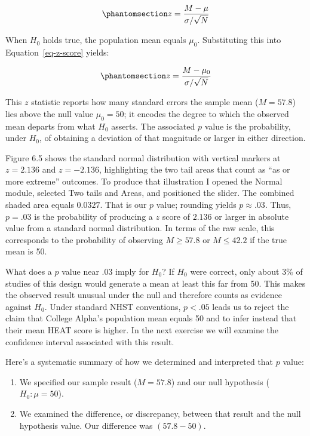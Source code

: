 \documentclass[
  letterpaper,
  DIV=11,
  numbers=noendperiod]{scrreprt}
\begin{document}
\begin{equation}\phantomsection\label{eq-z-score}{
z = \frac{M - \mu}{\sigma/\sqrt{N}}
}\end{equation}

When \(H_0\) holds true, the population mean equals \(\mu_0\).
Substituting this into Equation~\ref{eq-z-score} yields:

\begin{equation}\phantomsection\label{eq-z-null}{
z = \frac{M - \mu_0}{\sigma/\sqrt{N}}
}\end{equation}

This \(z\) statistic reports how many standard errors the sample mean
(\(M=57.8\)) lies above the null value \(\mu_0 = 50\); it encodes the
degree to which the observed mean departs from what \(H_0\) asserts. The
associated \(p\) value is the probability, under \(H_0\), of obtaining a
deviation of that magnitude or larger in either direction.

Figure 6.5 shows the standard normal distribution with vertical markers
at \(z = 2.136\) and \(z = -2.136\), highlighting the two tail areas
that count as ``as or more extreme'' outcomes. To produce that
illustration I opened the Normal module, selected Two tails and Areas,
and positioned the slider. The combined shaded area equals \(0.0327\).
That is our \(p\) value; rounding yields \(p \approx .03\). Thus,
\(p = .03\) is the probability of producing a \(z\) score of \(2.136\)
or larger in absolute value from a standard normal distribution. In
terms of the raw scale, this corresponds to the probability of observing
\(M \ge 57.8\) or \(M \le 42.2\) if the true mean is 50.

What does a \(p\) value near .03 imply for \(H_0\)? If \(H_0\) were
correct, only about 3\% of studies of this design would generate a mean
at least this far from 50. This makes the observed result unusual under
the null and therefore counts as evidence against \(H_0\). Under
standard NHST conventions, \(p < .05\) leads us to reject the claim that
College Alpha's population mean equals 50 and to infer instead that
their mean HEAT score is higher. In the next exercise we will examine
the confidence interval associated with this result.

Here's a systematic summary of how we determined and interpreted that
\(p\) value:

\begin{enumerate}
\def\labelenumi{\arabic{enumi}.}
\item
  We specified our sample result (\(M = 57.8\)) and our null hypothesis
  (\(H_0: \mu = 50\)).
\item
  We examined the difference, or discrepancy, between that result and
  the null hypothesis value. Our difference was \((57.8 - 50)\).
\end{enumerate}
\end{document}
